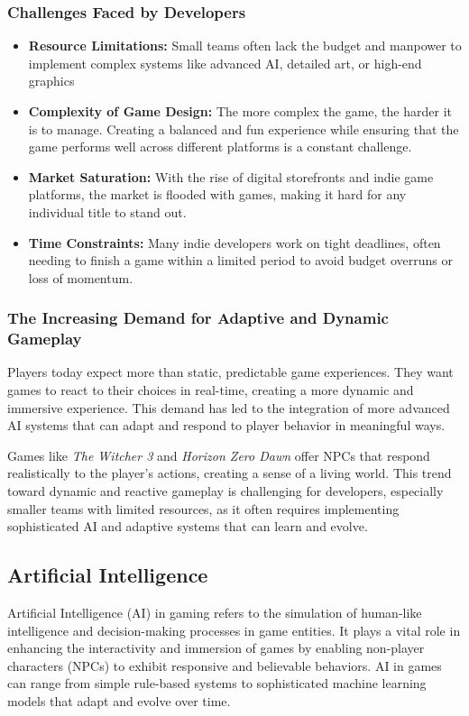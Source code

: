\documentclass[12pt,oneside,openright,a4paper]{cpe-english-project}
\begin{document}
\subsubsection{Challenges Faced by Developers}
\begin{itemize}
\item  \textbf{Resource Limitations:}
Small teams often lack the budget and manpower to implement complex systems like advanced AI, detailed art, or high-end graphics
\item  \textbf{Complexity of Game Design:}
The more complex the game, the harder it is to manage. Creating a balanced and fun experience while ensuring that the game performs well across different platforms is a constant challenge.
\item  \textbf{Market Saturation:}
With the rise of digital storefronts and indie game platforms, the market is flooded with games, making it hard for any individual title to stand out.
\item  \textbf{Time Constraints:}
Many indie developers work on tight deadlines, often needing to finish a game within a limited period to avoid budget overruns or loss of momentum.
\end{itemize}
\subsubsection{The Increasing Demand for Adaptive and Dynamic Gameplay}
Players today expect more than static, predictable game experiences. They want games to react to their choices in real-time, creating a more dynamic and immersive experience. This demand has led to the integration of more advanced AI systems that can adapt and respond to player behavior in meaningful ways.\par
Games like \emph{The Witcher 3} and \emph{Horizon Zero Dawn} offer NPCs that respond realistically to the player’s actions, creating a sense of a living world. This trend toward dynamic and reactive gameplay is challenging for developers, especially smaller teams with limited resources, as it often requires implementing sophisticated AI and adaptive systems that can learn and evolve.

\subsection{Artificial Intelligence}
Artificial Intelligence (AI) in gaming refers to the simulation of human-like intelligence and decision-making processes in game entities. It plays a vital role in enhancing the interactivity and immersion of games by enabling non-player characters (NPCs) to exhibit responsive and believable behaviors. AI in games can range from simple rule-based systems to sophisticated machine learning models that adapt and evolve over time.
\end{document}

